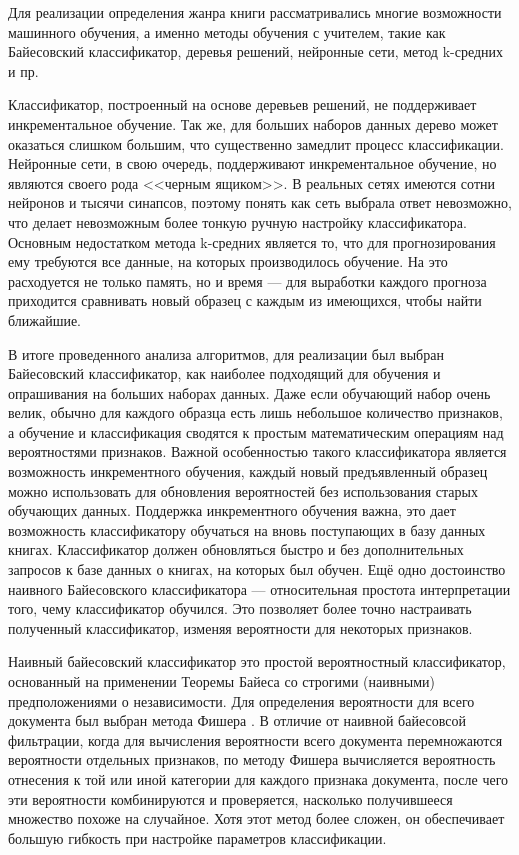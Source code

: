 Для реализации определения жанра книги рассматривались многие возможности машинного обучения, а именно методы обучения с учителем, такие как Байесовский классификатор, деревья решений, нейронные сети, метод k-средних и пр. \cite{collective-intelligence}

Классификатор, построенный на основе деревьев решений, не поддерживает инкрементальное обучение. Так же, для больших наборов данных дерево может оказаться слишком большим, что существенно замедлит процесс классификации. Нейронные сети, в свою очередь, поддерживают инкрементальное обучение, но являются своего рода <<черным ящиком>>. В реальных сетях имеются сотни нейронов и тысячи синапсов, поэтому понять как сеть выбрала ответ невозможно, что делает невозможным более тонкую ручную настройку классификатора. Основным недостатком метода k-средних является то, что для прогнозирования ему требуются все данные, на которых производилось обучение. На это расходуется не только память, но и время --- для выработки каждого прогноза приходится сравнивать новый образец с каждым из имеющихся, чтобы найти ближайшие. 

В итоге проведенного анализа алгоритмов, для реализации был выбран Байесовский классификатор, как наиболее подходящий для обучения и опрашивания на больших наборах данных. Даже если обучающий набор очень велик, обычно для каждого образца есть лишь небольшое количество признаков, а обучение и классификация сводятся к простым математическим операциям над вероятностями признаков. Важной особенностью такого классификатора является возможность инкрементного обучения, \te каждый новый предъявленный образец можно использовать для обновления вероятностей без использования старых обучающих данных. Поддержка инкрементного обучения важна, \tk это дает возможность классификатору обучаться на вновь поступающих в базу данных книгах. Классификатор должен обновляться быстро и без дополнительных запросов к базе данных о книгах, на которых был обучен. Ещё одно достоинство наивного Байесовского классификатора --- относительная простота интерпретации того, чему классификатор обучился. Это позволяет более точно настраивать полученный классификатор, изменяя вероятности для некоторых признаков.

Наивный байесовский классификатор это простой вероятностный классификатор, основанный на применении Теоремы Байеса со строгими (наивными) предположениями о независимости. Для определения вероятности для всего документа был выбран метода Фишера \cite{collective-intelligence}. 
В отличие от наивной байесовсой фильтрации, когда для вычисления вероятности всего документа перемножаются вероятности отдельных признаков, по методу Фишера вычисляется вероятность отнесения к той или иной категории для каждого признака документа, после чего эти вероятности комбинируются и проверяется, насколько получившееся множество похоже на случайное. Хотя этот метод более сложен, он обеспечивает большую гибкость при настройке параметров классификации.

